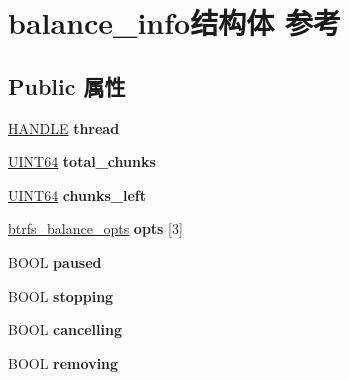\hypertarget{structbalance__info}{}\section{balance\+\_\+info结构体 参考}
\label{structbalance__info}
\subsection*{Public 属性}
\begin{DoxyCompactItemize}
\item 
\mbox{\label{structbalance__info_a7835263944da2b72d731aa1ec5b245ed}} 
\hyperlink{interfacevoid}{H\+A\+N\+D\+LE} {\bfseries thread}
\item 
\mbox{\label{structbalance__info_a8a7b9f9c1ce109192f36eb97575ab3e7}} 
\hyperlink{_processor_bind_8h_a57be03562867144161c1bfee95ca8f7c}{U\+I\+N\+T64} {\bfseries total\+\_\+chunks}
\item 
\mbox{\label{structbalance__info_aa6ac3d0e23aabcd624fae5e666f90b45}} 
\hyperlink{_processor_bind_8h_a57be03562867144161c1bfee95ca8f7c}{U\+I\+N\+T64} {\bfseries chunks\+\_\+left}
\item 
\mbox{\label{structbalance__info_a5040b0eb4a6591029d21633275aeb6fb}} 
\hyperlink{structbtrfs__balance__opts}{btrfs\+\_\+balance\+\_\+opts} {\bfseries opts} \mbox{[}3\mbox{]}
\item 
\mbox{\label{structbalance__info_aee53a06a96bed7593ac61d8300d3c86a}} 
B\+O\+OL {\bfseries paused}
\item 
\mbox{\label{structbalance__info_aa6737760482e4427dd366d3f6c50966e}} 
B\+O\+OL {\bfseries stopping}
\item 
\mbox{\label{structbalance__info_aeb4cf03a3fa3838f5c6dc7bc063954d7}} 
B\+O\+OL {\bfseries cancelling}
\item 
\mbox{\label{structbalance__info_aab8e61ffd1269c0b683740206771f967}} 
B\+O\+OL {\bfseries removing}
\item 
\mbox{\label{structbalance__info_a4e52ca8d0c32ad936d43d9eea46bf29e}} 

\end{DoxyCompactItemize}
